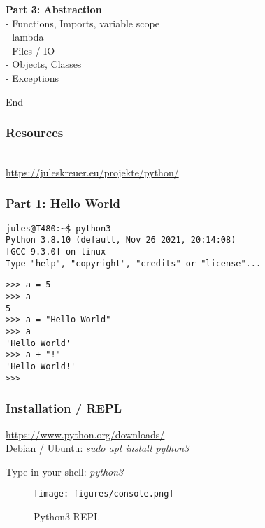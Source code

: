 \documentclass{beamer}
\begin{document}
\begin{frame}
    \begin{block}{}
        \textbf{Part 3: Abstraction}\\
        - Functions, Imports, variable scope\\
        - lambda\\
        - Files / IO\\
        - Objects, Classes\\
        - Exceptions\\
    \end{block}
    \begin{exampleblock}{}
    End
    \end{exampleblock}
\end{frame}
\begin{frame}[fragile]
    \frametitle{Resources}
    \center
    \\
    \center
    \url{https://juleskreuer.eu/projekte/python/}
\end{frame}

\begin{frame}[fragile]
    \frametitle{\textbf{Part 1:} Hello World}
    \begin{verbatim}
jules@T480:~$ python3
Python 3.8.10 (default, Nov 26 2021, 20:14:08)
[GCC 9.3.0] on linux
Type "help", "copyright", "credits" or "license"...
    \end{verbatim}
\begin{verbatim}
>>> a = 5
>>> a
5
>>> a = "Hello World"
>>> a
'Hello World'
>>> a + "!"
'Hello World!'
>>>
    \end{verbatim}
\end{frame}

\begin{frame}
    \frametitle{Installation / REPL}
    \begin{center}
        \url{https://www.python.org/downloads/}\\
        Debian / Ubuntu: \textit{sudo apt install python3}\\
    \end{center}
    \begin{center}
        Type in your shell: \textit{python3}
    \end{center}
\end{frame}

\begin{frame}
    \begin{figure}
        \texttt{[image: figures/console.png]}
        \caption{Python3 REPL}
    \end{figure}
\end{frame}
\end{document}
